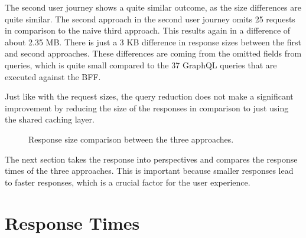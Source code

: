 \bigskip

\noindent The second user journey shows a quite similar outcome, as the size differences are quite similar. The second approach in the second user journey omits 25 requests in comparison to the naive third approach. This results again in a difference of about 2.35 MB. There is just a 3 KB difference in response sizes between the first and second approaches. These differences are coming from the omitted fields from queries, which is quite small compared to the 37 GraphQL queries that are executed against the \ac{BFF}.

\bigskip

\noindent Just like with the request sizes, the query reduction does not make a significant improvement by reducing the size of the responses in comparison to just using the shared caching layer.

\begin{figure}[H]
  \centering
  \caption{Response size comparison between the three approaches.}\label{fig:discussion:response-size}
\end{figure}

\noindent The next section takes the response into perspectives and compares the response times of the three approaches. This is important because smaller responses lead to faster responses, which is a crucial factor for the user experience.

\section{Response Times}\label{section:discussion:response-times}


